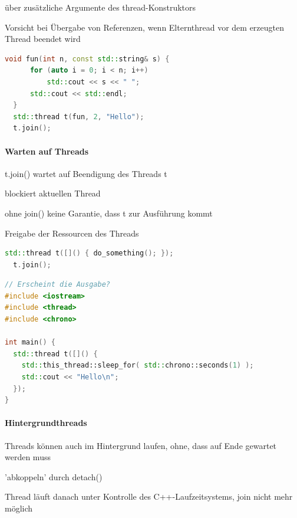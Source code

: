 \documentclass[10pt]{article}
\begin{document}
\begin{itemize*}
  \item über zusätzliche Argumente des thread-Konstruktors
  \item Vorsicht bei Übergabe von Referenzen, wenn Elternthread vor dem erzeugten Thread beendet wird
\end{itemize*}
\begin{lstlisting}[language=C++]
  void fun(int n, const std::string& s) {
      for (auto i = 0; i < n; i++)
          std::cout << s << " ";
      std::cout << std::endl;
  }
  std::thread t(fun, 2, "Hello");
  t.join();
  \end{lstlisting}

\paragraph{Warten auf Threads}

\begin{itemize*}
  \item t.join() wartet auf Beendigung des Threads t
  \item blockiert aktuellen Thread
  \item ohne join() keine Garantie, dass t zur Ausführung kommt
  \item Freigabe der Ressourcen des Threads
\end{itemize*}
\begin{lstlisting}[language=C++]
  std::thread t([]() { do_something(); });
  t.join();
\end{lstlisting}
\begin{lstlisting}[language=C++]
// Erscheint die Ausgabe?
#include <iostream>
#include <thread>
#include <chrono>

int main() {
  std::thread t([]() {
    std::this_thread::sleep_for( std::chrono::seconds(1) );
    std::cout << "Hello\n";
  });
}
\end{lstlisting}

\paragraph{Hintergrundthreads}

\begin{itemize*}
  \item Threads können auch im Hintergrund laufen, ohne, dass auf Ende gewartet werden muss
  \item 'abkoppeln' durch detach()
  \item Thread läuft danach unter Kontrolle des C++-Laufzeitsystems, join nicht mehr möglich
\end{itemize*}
\end{document}
